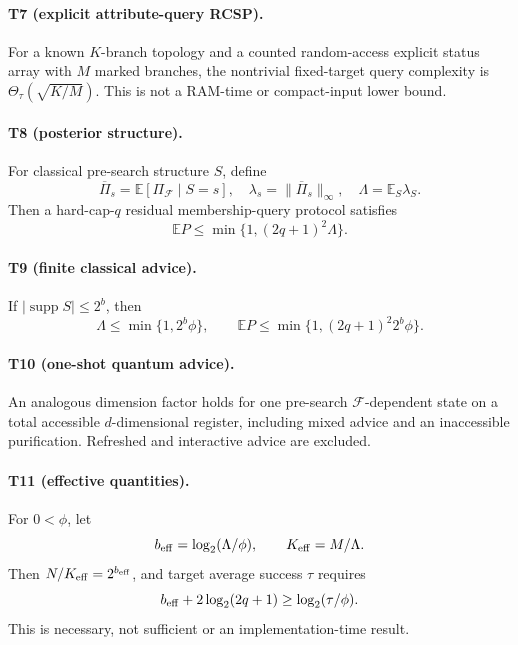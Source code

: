 \documentclass[11pt]{article}
\begin{document}
\paragraph{T7 (explicit attribute-query RCSP).}
For a known $K$-branch topology and a counted random-access explicit status
array with $M$ marked branches, the nontrivial fixed-target query complexity is
$\Theta_\tau(\sqrt{K/M})$. This is not a RAM-time or compact-input lower bound.

\paragraph{T8 (posterior structure).}
For classical pre-search structure $S$, define
\[
\overline\Pi_s=\mathbb E[\Pi_{\mathcal F}\mid S=s],\quad
\lambda_s=\|\overline\Pi_s\|_\infty,\quad
\Lambda=\mathbb E_S\lambda_S.
\]
Then a hard-cap-$q$ residual membership-query protocol satisfies
\[\mathbb E P\le\min\{1,(2q+1)^2\Lambda\}.\]

\paragraph{T9 (finite classical advice).}
If $|\operatorname{supp}S|\le2^b$, then
\[
\Lambda\le\min\{1,2^b\phi\},\qquad
\mathbb E P\le\min\{1,(2q+1)^2 2^b\phi\}.
\]

\paragraph{T10 (one-shot quantum advice).}
An analogous dimension factor holds for one pre-search
$\mathcal F$-dependent state on a total accessible $d$-dimensional register,
including mixed advice and an inaccessible purification. Refreshed and
interactive advice are excluded.

\paragraph{T11 (effective quantities).}
For $0<\phi$, let
\[b_{\rm eff}=\log_2(\Lambda/\phi),\qquad K_{\rm eff}=M/\Lambda.\]
Then $N/K_{\rm eff}=2^{b_{\rm eff}}$, and target average success $\tau$ requires
\[
b_{\rm eff}+2\log_2(2q+1)\ge\log_2(\tau/\phi).
\]
This is necessary, not sufficient or an implementation-time result.
\end{document}
